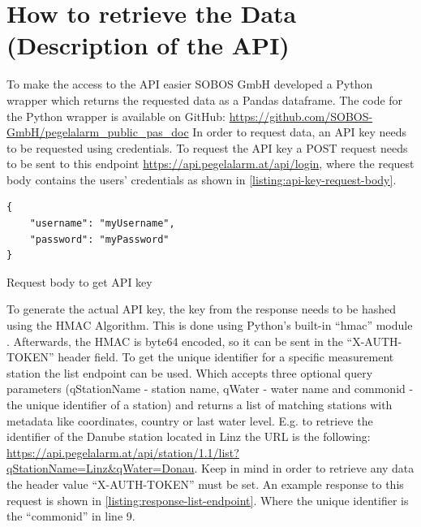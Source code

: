 \section{How to retrieve the Data (Description of the API)}
To make the access to the API easier SOBOS GmbH developed a Python wrapper which returns the requested data as a Pandas dataframe.\cite{PandasDocumentationPandas} The code for the Python wrapper is available on GitHub\cite{GitHub}: \url{https://github.com/SOBOS-GmbH/pegelalarm_public_pas_doc} \cite{strassmayrPegelalarmAPIWrapper2022}
\newline
\newline
In order to request data, an API key needs to be requested using credentials. To request the API key a POST request needs to be sent to this endpoint \url{https://api.pegelalarm.at/api/login}, where the request body contains the users' credentials as shown in \autoref{listing:api-key-request-body}. 
\begin{listing}
\begin{verbatim}
{
    "username": "myUsername",
    "password": "myPassword"
}
\end{verbatim}
\caption{Request body to get API key}
\label{listing:api-key-request-body}
\end{listing}
To generate the actual API key, the key from the response needs to be hashed using the \ac{HMAC} Algorithm. This is done using Python's built-in ``hmac'' module \cite{HmacKeyedHashingMessage}. Afterwards, the \ac{HMAC} is byte64 encoded, so it can be sent in the ``X-AUTH-TOKEN'' header field.
\newline
To get the unique identifier for a specific measurement station the list endpoint can be used. Which accepts three optional query parameters (qStationName - station name, qWater - water name and commonid - the unique identifier of a station) and returns a list of matching stations with metadata like coordinates, country or last water level. E.g. to retrieve the identifier of the Danube station located in Linz the URL is the following: \url{https://api.pegelalarm.at/api/station/1.1/list?qStationName=Linz&qWater=Donau}. Keep in mind in order to retrieve any data the header value ``X-AUTH-TOKEN'' must be set. An example response to this request is shown in \autoref{listing:response-list-endpoint}. Where the unique identifier is the ``commonid'' in line 9.
